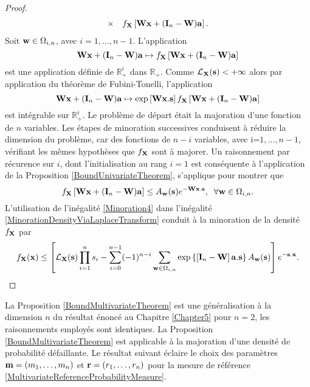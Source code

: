 \begin{proof}
\begin{eqnarray}
&\times&f_{\bold{X}}\left[\bold{W}\bold{x}+(\bold{I}_{n}-\bold{W})\bold{a}\right]\label{MinorationDensityViaLaplaceTransform}.
\end{eqnarray}
Soit $\bold{w}\in\Omega_{i,n}$, avec $i=1,\ldots,n-1$. L\rq{}application 
\begin{equation}\label{DummyFunction1}
\bold{W}\bold{x}+(\bold{I}_{n}-\bold{W})\bold{a}\mapsto f_{\bold{X}}\left[\bold{W}\bold{x}+(\bold{I}_{n}-\bold{W})\bold{a}\right]
\end{equation}
est une application définie de $\mathbb{R}_{+}^{i}$ dans $\mathbb{R}_{+}$. Comme $\mathcal{L}_{\bold{X}}(\bold{s})<+\infty$ alors par application du théorème de Fubini-Tonelli, l'application 
\begin{equation}\label{DummyFunction2}
\bold{W}\bold{x}+(\bold{I}_{n}-\bold{W})\bold{a}\mapsto \exp\left[\bold{W}\bold{x}.\bold{s}\right]f_{\bold{X}}\left[\bold{W}\bold{x}+(\bold{I}_{n}-\bold{W})\bold{a}\right]
\end{equation}
est intégrable sur $\mathbb{R}_{+}^{i}$. Le problème de départ était la majoration d\rq{}une fonction de $n$ variables. Les étapes de minoration successives conduisent à réduire la dimension du problème, car des fonctions de $n-i$ variables, avec i=$1,\ldots,n-1$, vérifiant les mêmes hypothèses que $f_{\bold{X}}$ sont à majorer. Un raisonnement par récurence sur $i$, dont l\rq{}initialisation au rang $i=1$ est conséquente à l\rq{}application de la Proposition \ref{BoundUnivariateTheorem},  s\rq{}applique pour montrer que 
\begin{equation}\label{Minoration4}
f_{\bold{X}}\left[\bold{W}\bold{x}+(\bold{I}_{n}-\bold{W})\bold{a}\right]\leq A_{\bold{w}}(\bold{s})e^{-\bold{W}\bold{x}.\bold{s}}, \hspace{0.2cm} \forall\bold{w}\in\Omega_{i,n}.
\end{equation}
L\rq{}utilisation de l\rq{}inégalité \eqref{Minoration4} dans l\rq{}inégalité \eqref{MinorationDensityViaLaplaceTransform} conduit à la minoration de la densité $f_{\bold{X}}$ par 
\begin{equation}
f_{\bold{X}}(\bold{x})\leq\left[\mathcal{L}_{\bold{X}}(\bold{s})\prod_{i=1}^{n}s_{i}-\sum_{i=0}^{n-1}(-1)^{n-i}\sum_{\bold{w}\in\Omega_{i,n}}\exp\left\{\left[\bold{I}_{n}-\bold{W}\right]\bold{a}.\bold{s}\right\}A_{\bold{w}}(\bold{s})\right]e^{-\bold{s}.\bold{x}}.
\end{equation}
\end{proof}   
La Proposition \ref{BoundMultivariateTheorem} est une généralisation à la dimension $n$ du résultat énoncé au Chapitre \ref{Chapter5} pour $n=2$, les raisonnements employés sont identiques. La Proposition \ref{BoundMultivariateTheorem} est applicable à la majoration d'une densité de probabilité défaillante. Le résultat suivant éclaire le choix des paramètres $\bold{m}=(m_{1},\ldots,m_{n})$ et $\bold{r}=(r_{1},\ldots,r_{n})$ pour la mesure de référence \eqref{MultivariateReferenceProbabilityMeasure}.
